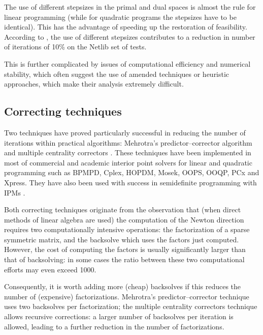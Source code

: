 The use of different stepsizes in the primal and dual spaces is
almost the rule for linear programming (while for quadratic programs
the stepsizes have to be identical). This has the advantage of
speeding up the restoration of feasibility. According to
\cite{GondzioTerlaky}, the use of different stepsizes contributes 
to a reduction in number of iterations of 10\% on the Netlib
set of tests.

This is further complicated by issues of computational efficiency
and numerical stability, which often suggest the use of amended
techniques or heuristic approaches, which make their analysis
extremely difficult.

%
%
\subsection{Correcting techniques}

Two techniques have proved particularly successful in reducing 
the number of iterations within practical algorithms:
Mehrotra's predictor--corrector algorithm \cite{Mehrotra92} 
and multiple centrality correctors \cite{Gondzio96}. These 
techniques have been implemented in most of commercial and academic 
interior point solvers for linear and quadratic programming such 
as BPMPD, Cplex, HOPDM, Mosek, OOPS, OOQP, PCx and Xpress. 
They have also been used with success in semidefinite 
programming with IPMs \cite{Haeberly99}.

Both correcting techniques originate from the observation that 
(when direct methods of linear algebra are used) the computation 
of the Newton direction requires two computationally intensive
operations: the factorization of a sparse symmetric matrix, and
the backsolve which uses the factors just computed. 
However, the cost of computing the factors is usually significantly 
larger than that of backsolving: in some cases the ratio between 
these two computational efforts may even exceed 1000. 


Consequently, it is worth adding more (cheap) 
backsolves if this reduces the number of (expensive) factorizations. 
Mehrotra's predictor--corrector technique \cite{Mehrotra92} uses two 
backsolves per factorization; the multiple centrality correctors technique
\cite{Gondzio96} allows recursive corrections: a larger number 
of backsolves per iteration is allowed, leading to a further reduction 
in the number of factorizations. 

